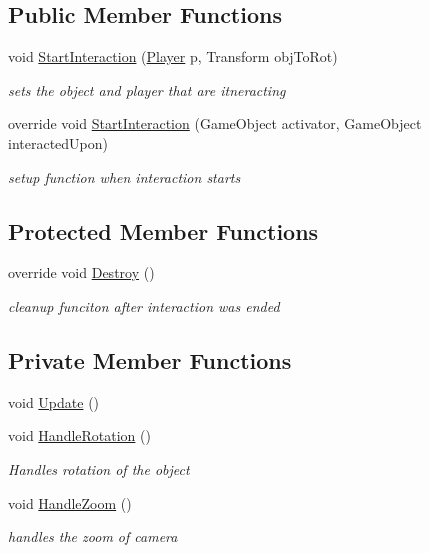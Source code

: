 \subsection*{Public Member Functions}
\begin{DoxyCompactItemize}
\item 
void \mbox{\hyperlink{class_rotate_and_zoom_component_a1afdb59de9b4b255456351189e2f6932}{Start\+Interaction}} (\mbox{\hyperlink{class_player}{Player}} p, Transform obj\+To\+Rot)
\begin{DoxyCompactList}\small\item\em sets the object and player that are itneracting \end{DoxyCompactList}\item 
override void \mbox{\hyperlink{class_rotate_and_zoom_component_ac6afb9569858cf59c584c7bdfac41def}{Start\+Interaction}} (Game\+Object activator, Game\+Object interacted\+Upon)
\begin{DoxyCompactList}\small\item\em setup function when interaction starts \end{DoxyCompactList}\end{DoxyCompactItemize}
\subsection*{Protected Member Functions}
\begin{DoxyCompactItemize}
\item 
override void \mbox{\hyperlink{class_rotate_and_zoom_component_aa116a1acdc75d587605b6fa043474982}{Destroy}} ()
\begin{DoxyCompactList}\small\item\em cleanup funciton after interaction was ended \end{DoxyCompactList}\end{DoxyCompactItemize}
\subsection*{Private Member Functions}
\begin{DoxyCompactItemize}
\item 
void \mbox{\hyperlink{class_rotate_and_zoom_component_af92720943f59348caa6f58952fec5c6b}{Update}} ()
\item 
void \mbox{\hyperlink{class_rotate_and_zoom_component_a4f44c8f8dc5f9b2f1f38075595d20489}{Handle\+Rotation}} ()
\begin{DoxyCompactList}\small\item\em Handles rotation of the object \end{DoxyCompactList}\item 
void \mbox{\hyperlink{class_rotate_and_zoom_component_a8157abad4e54f49ebccf9499a3f698a8}{Handle\+Zoom}} ()
\begin{DoxyCompactList}\small\item\em handles the zoom of camera \end{DoxyCompactList}\end{DoxyCompactItemize}
